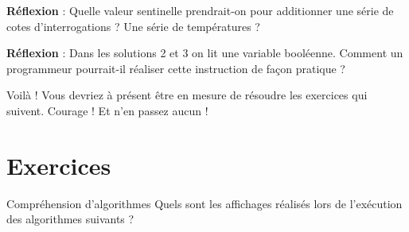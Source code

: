		\textbf{Réflexion} : 
		Quelle valeur sentinelle prendrait-on 
		pour additionner une série de cotes d'interrogations ? 
		Une série de températures ?

		\textbf{Réflexion} : 
		Dans les solutions 2 et 3 on lit une variable booléenne. 
		Comment un programmeur pourrait-il réaliser 
		cette instruction de façon pratique ?
		
		Voilà ! Vous devriez à présent être en mesure de
		résoudre les exercices qui suivent.
		Courage ! Et n'en passez aucun !
		

\section{Exercices}

\begin{Exercice}{Compréhension d'algorithmes}
	Quels sont les affichages réalisés lors de l'exécution
	des algorithmes suivants ?
	
	




\end{Exercice}
